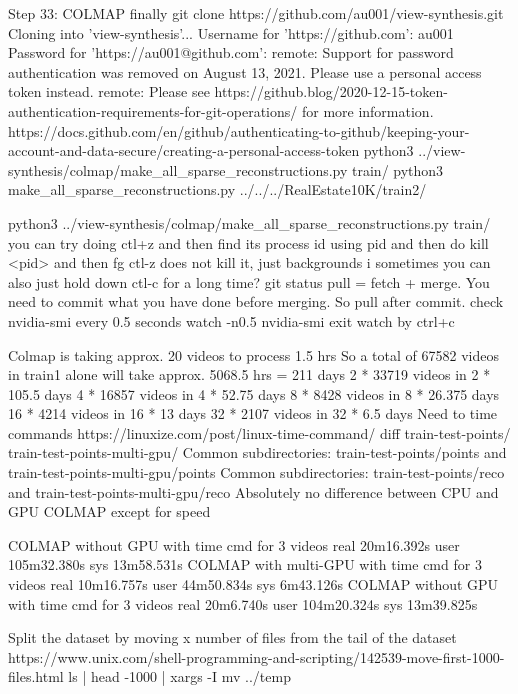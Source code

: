 Step 33: COLMAP finally
git clone https://github.com/au001/view-synthesis.git
Cloning into 'view-synthesis'...
Username for 'https://github.com': au001
Password for 'https://au001@github.com': 
remote: Support for password authentication was removed on August 13, 2021. Please use a personal access token instead.
remote: Please see https://github.blog/2020-12-15-token-authentication-requirements-for-git-operations/ for more information.
https://docs.github.com/en/github/authenticating-to-github/keeping-your-account-and-data-secure/creating-a-personal-access-token
python3 ../view-synthesis/colmap/make_all_sparse_reconstructions.py train/
python3 make_all_sparse_reconstructions.py ../../../RealEstate10K/train2/


python3 ../view-synthesis/colmap/make_all_sparse_reconstructions.py train/
you can try doing ctl+z
and then find its process id using pid
and then do kill <pid>
and then fg
ctl-z does not kill it, just backgrounds i
sometimes you can also just hold down ctl-c for a long time?
git status
pull = fetch + merge.
You need to commit what you have done before merging.
So pull after commit.
check nvidia-smi every 0.5 seconds
watch -n0.5 nvidia-smi
exit watch by ctrl+c



Colmap is taking approx. 20 videos to process 1.5 hrs 
So a total of 67582 videos in train1 alone will take approx. 5068.5 hrs = 211 days
2 * 33719 videos in 2 * 105.5 days
4 * 16857 videos in 4 * 52.75 days
8 * 8428 videos in 8 * 26.375 days
16 * 4214 videos in 16 * 13 days
32 * 2107 videos in 32 * 6.5 days
Need to time commands https://linuxize.com/post/linux-time-command/
diff train-test-points/ train-test-points-multi-gpu/
Common subdirectories: train-test-points/points and train-test-points-multi-gpu/points
Common subdirectories: train-test-points/reco and train-test-points-multi-gpu/reco
Absolutely no difference between CPU and GPU COLMAP except for speed


COLMAP without GPU with time cmd for 3 videos
real    20m16.392s
user    105m32.380s
sys     13m58.531s
  COLMAP with multi-GPU with time cmd for 3 videos
real    10m16.757s
user    44m50.834s
sys     6m43.126s
COLMAP without GPU with time cmd for 3 videos
real    20m6.740s
user    104m20.324s
sys     13m39.825s


 Split the dataset by moving x number of files from the tail of the dataset
https://www.unix.com/shell-programming-and-scripting/142539-move-first-1000-files.html
ls | head -1000 | xargs -I{} mv {} ../temp


